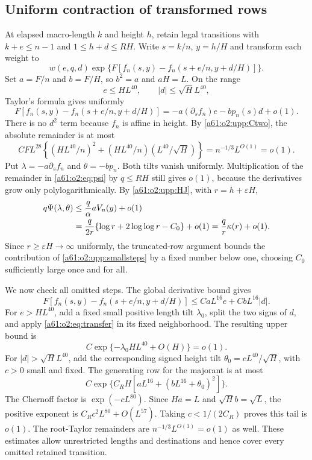 \documentclass[11pt,letterpaper]{article}
\numberwithin{equation}{section}
\theoremstyle{remark}\newtheorem{remark}[theorem]{Remark}
\begin{document}
\subsection{Uniform contraction of transformed rows}
At elapsed macro-length $k$ and height $h$, retain legal transitions with $k+e\le n-1$ and $1\le h+d\le RH$. Write $s=k/n$, $y=h/H$ and transform each weight to
\begin{equation}\label{a61:o2:upp:transformed}
 w(e,q,d)\exp\{F[f_n(s,y)-f_n(s+e/n,y+d/H)]\}.
\end{equation}
Set $a=F/n$ and $b=F/H$, so $b^2=a$ and $aH=L$.
On the range
\begin{equation}\label{a61:o2:upp:smallsteps}
 e\le HL^{40},\qquad |d|\le\sqrt H L^{40},
\end{equation}
Taylor's formula gives uniformly
\begin{equation}\label{a61:o2:upp:taylor}
 F[f_n(s,y)-f_n(s+e/n,y+d/H)]
 =-a(\partial_s f_n)e-bp_n(s)d+o(1).
\end{equation}
There is no $d^2$ term because $f_n$ is affine in height. By \eqref{a61:o2:upp:Ctwo}, the absolute remainder is at most
\[
 CFL^{28}\left\{(HL^{40}/n)^2
                   +(HL^{40}/n)(L^{40}/\sqrt H)\right\}
       =n^{-1/3}L^{O(1)}=o(1).
\]
Put $\lambda=-a\partial_sf_n$ and $\theta=-bp_n$. Both tilts vanish uniformly. Multiplication of the remainder in \eqref{a61:o2:eq:psi} by $q\le RH$ still gives $o(1)$, because the derivatives grow only polylogarithmically. By \eqref{a61:o2:upp:HJ}, with $r=h+\varepsilon H$,
\begin{align}
 q\Psi(\lambda,\theta)
 &\le\frac q\alpha aV_n(y)+o(1)\notag\\
 &=\frac q{2r}\{\log r+2\log\log r-C_0\}+o(1)
   =\frac q r\kappa(r)+o(1).\label{a61:o2:upp:row-exponent}
\end{align}
Since $r\ge\varepsilon H\to\infty$ uniformly, the truncated-row argument bounds the contribution of \eqref{a61:o2:upp:smallsteps} by a fixed number below one, choosing $C_0$ sufficiently large once and for all.

We now check all omitted steps. The global derivative bound gives
\begin{equation}\label{a61:o2:upp:global-majorant}
 F[f_n(s,y)-f_n(s+e/n,y+d/H)]
       \le CaL^{16}e+CbL^{16}|d|.
\end{equation}
For $e>HL^{40}$, add a fixed small positive length tilt $\lambda_0$, split the two signs of $d$, and apply \eqref{a61:o2:eq:transfer} in its fixed neighborhood. The resulting upper bound is
\[
 C\exp\{-\lambda_0HL^{40}+O(H)\}=o(1).
\]
For $|d|>\sqrt H L^{40}$, add the corresponding signed height tilt
$\theta_0=cL^{40}/\sqrt H$, with $c>0$ small and fixed. The generating row for the majorant is at most
\[
 C\exp\{C_RH[aL^{16}+(bL^{16}+\theta_0)^2]\}.
\]
The Chernoff factor is $\exp(-cL^{80})$. Since
$Ha=L$ and $\sqrt H b=\sqrt L$, the positive exponent is
$C_Rc^2L^{80}+O(L^{57})$. Taking $c<1/(2C_R)$ proves this tail is $o(1)$. The root-Taylor remainders are $n^{-1/3}L^{O(1)}=o(1)$ as well. These estimates allow unrestricted lengths and destinations and hence cover every omitted retained transition.
\end{document}
